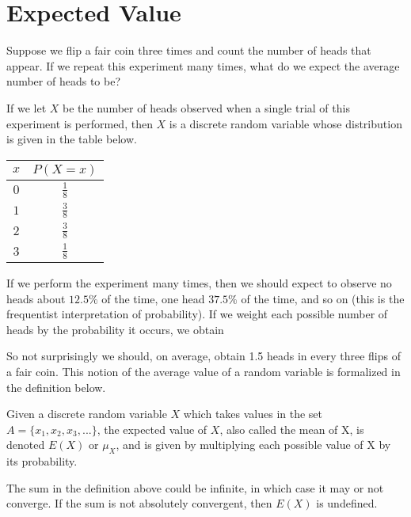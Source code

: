 \section{Expected Value}\label{ExpectedValueSec}
\par
Suppose we flip a fair coin three times and count the number of heads that appear. If we repeat this experiment many times, what do we expect the average number of heads to be?
\par
If we let $X$ be the number of heads observed when a single trial of this experiment is performed, then $X$ is a discrete random variable whose distribution is given in the table below.
\vspace{-0.5em}
\renewcommand*{\arraystretch}{1.35}
\begin{center}
\begin{tabular}{c|c}
$x$ & $P(X = x)$ \\
\hline
$0$ & $\frac{1}{8}$ \\
$1$ & $\frac{3}{8}$ \\
$2$ & $\frac{3}{8}$ \\
$3$ & $\frac{1}{8}$
\end{tabular}
\end{center}
\renewcommand*{\arraystretch}{1}
\par
If we perform the experiment many times, then we should expect to observe no heads about $12.5\%$ of the time, one head $37.5\%$ of the time, and so on (this is the frequentist interpretation of probability). If we weight each possible number of heads by the probability it occurs, we obtain
\par
So not surprisingly we should, on average, obtain 1.5 heads in every three flips of a fair coin. This notion of the average value of a random variable is formalized in the definition below.

\begin{defn}\label{expectedvaluedef}
Given a discrete random variable $X$ which takes values in the set $A = \{x_1, x_2, x_3, ...\}$, the expected value of $X$, also called the mean of X, is denoted $E(X)$ or $\mu_X$, and is given by multiplying each possible value of X by its probability.
\end{defn}

\rmk The sum in the definition above could be infinite, in which case it may or not converge. If the sum is not absolutely convergent, then $E(X)$ is undefined.

